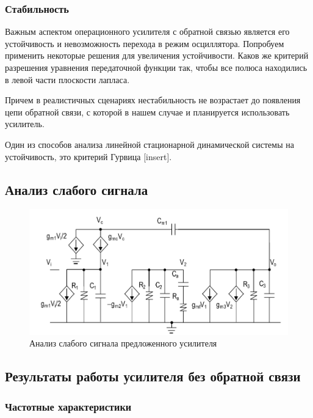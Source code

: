\documentclass[a4paper,12pt]{article} %
\begin{document}
\subsubsection{Стабильность}

Важным аспектом операционного усилителя с обратной связью является его устойчивость и невозможность перехода в режим осциллятора. Попробуем применить некоторые решения для увеличения устойчивости. Каков же критерий разрешения уравнения передаточной функции так, чтобы все полюса находились в левой части плоскости лапласа.

Причем в реалистичных сценариях нестабильность не возрастает до появления цепи обратной связи, с которой в нашем случае и планируется использовать усилитель.

Один из способов анализа линейной стационарной динамической системы на устойчивость, это критерий Гурвица [insert].


\subsection{Анализ слабого сигнала }

\begin{figure}[H]
    \includegraphics[width=\textwidth]{small_signal.png}
    \caption{Анализ слабого сигнала предложенного усилителя}
    \label{pic:feedback}
\end{figure}



\subsection{Результаты работы усилителя без обратной связи}


\subsubsection{Частотные характеристики}
\end{document}

